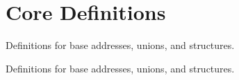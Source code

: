 \hypertarget{group___c_m_s_i_s__core__base}{\section{Core Definitions}
\label{group___c_m_s_i_s__core__base}
}


Definitions for base addresses, unions, and structures.  


Definitions for base addresses, unions, and structures. 